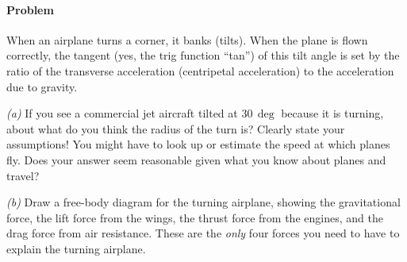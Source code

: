 \documentclass[12pt]{article}
\begin{document}
\paragraph{Problem~\theproblem}%
When an airplane turns a corner, it banks (tilts). When the plane is
flown correctly, the tangent (yes, the trig function ``tan'') of this
tilt angle is set by the ratio of the transverse acceleration
(centripetal acceleration) to the acceleration due to gravity.

\textsl{(a)} If you see a commercial jet aircraft tilted at $30\,\deg$
because it is turning, about what do you think the radius of the turn
is? Clearly state your assumptions! You might have to look up or
estimate the speed at which planes fly. Does your answer seem
reasonable given what you know about planes and travel?

\textsl{(b)} Draw a free-body diagram for the turning airplane,
showing the gravitational force, the lift force from the wings, the
thrust force from the engines, and the drag force from air resistance.
These are the \emph{only} four forces you need to have to explain
the turning airplane.
\end{document}
